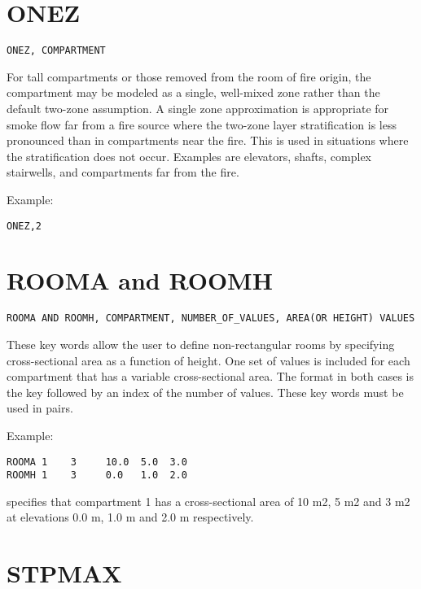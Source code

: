 \section{ONEZ}

\begin{lstlisting}
ONEZ, COMPARTMENT
\end{lstlisting}

For tall compartments or those removed from the room of fire origin, the compartment may be modeled as a single, well-mixed zone rather than the default two-zone assumption. A single zone approximation is appropriate for smoke flow far from a fire source where the two-zone layer stratification is less pronounced than in compartments near the fire. This is used in situations where the stratification does not occur. Examples are elevators, shafts, complex stairwells, and compartments far from the fire.

Example:

\begin{lstlisting}
ONEZ,2
\end{lstlisting}

\section{ROOMA and ROOMH}

\begin{lstlisting}
ROOMA AND ROOMH, COMPARTMENT, NUMBER_OF_VALUES, AREA(OR HEIGHT) VALUES
\end{lstlisting}

These key words allow the user to define non-rectangular rooms by specifying cross-sectional area as a function of height. One set of values is included for each compartment that has a variable cross-sectional area. The format in both cases is the key followed by an index of the number of values. These key words must be used in pairs.

Example:

\begin{lstlisting}
ROOMA 1    3     10.0  5.0  3.0
ROOMH 1    3     0.0   1.0  2.0
\end{lstlisting}

specifies that compartment 1 has a cross-sectional area of 10 m2, 5 m2 and 3 m2 at elevations 0.0 m, 1.0 m and 2.0 m respectively.

\section{STPMAX}

